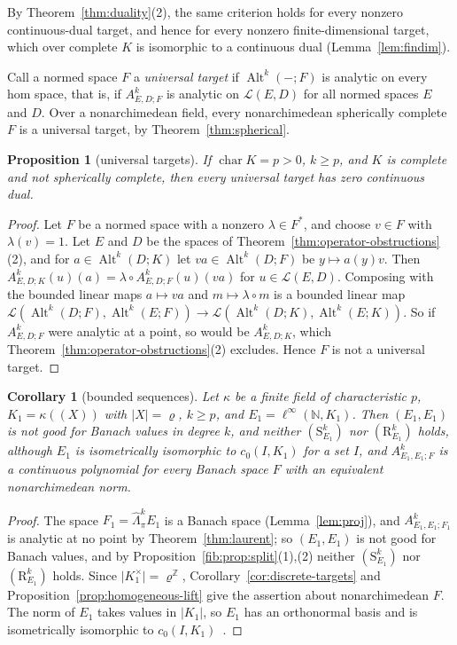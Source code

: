 \documentclass[11pt]{amsart}
\newtheorem{proposition}[theorem]{Proposition}
\newtheorem{corollary}[theorem]{Corollary}
\theoremstyle{definition}
\theoremstyle{remark}
\numberwithin{equation}{section}
\newcommand{\N}{\mathbb N}
\newcommand{\Z}{\mathbb Z}
\newcommand{\cL}{\mathcal L}
\newcommand{\Alt}{\operatorname{Alt}}
\newcommand{\linf}{\ell^\infty}
\newcommand{\abs}[1]{\lvert #1\rvert}
\theoremstyle{plain}
\theoremstyle{definition}
\theoremstyle{plain}
\begin{document}
By Theorem~\ref{thm:duality}(2), the same criterion holds for every nonzero continuous-dual target, and hence for every
nonzero finite-dimensional target, which over complete $K$ is isomorphic to a continuous dual (Lemma~\ref{lem:findim}).

Call a normed space $F$ a \emph{universal target} if $\Alt^k(-;F)$ is analytic on every hom space, that is, if
$A^k_{E,D;F}$ is analytic on $\cL(E,D)$ for all normed spaces $E$ and $D$. Over a nonarchimedean field, every
nonarchimedean spherically complete $F$ is a universal target, by Theorem~\ref{thm:spherical}.

\begin{proposition}[universal targets]\label{prop:universal-zero-dual}
If $\operatorname{char}K=p>0$, $k\ge p$, and $K$ is complete and not spherically complete, then every universal target
has zero continuous dual.
\end{proposition}

\begin{proof}
Let $F$ be a normed space with a nonzero $\lambda\in F^*$, and choose $v\in F$ with $\lambda(v)=1$. Let $E$ and $D$ be the
spaces of Theorem~\ref{thm:operator-obstructions}(2), and for $a\in\Alt^k(D;K)$ let $va\in\Alt^k(D;F)$ be $y\mapsto a(y)v$.
Then $A^k_{E,D;K}(u)(a)=\lambda\circ A^k_{E,D;F}(u)(va)$ for $u\in\cL(E,D)$. Composing with the bounded linear maps
$a\mapsto va$ and $m\mapsto\lambda\circ m$ is a bounded linear map
$\cL(\Alt^k(D;F),\Alt^k(E;F))\to\cL(\Alt^k(D;K),\Alt^k(E;K))$. So if $A^k_{E,D;F}$ were analytic at a point, so would be
$A^k_{E,D;K}$, which Theorem~\ref{thm:operator-obstructions}(2) excludes. Hence $F$ is not a universal target.
\end{proof}

\begin{corollary}[bounded sequences]\label{obs:cor:linf}
Let $\kappa$ be a finite field of characteristic $p$, $K_1=\kappa((X))$ with $\abs X=\varrho$, $k\ge p$, and
$E_1=\linf(\N,K_1)$. Then $(E_1,E_1)$ is not good for Banach values in degree $k$, and neither $(\mathrm S^k_{E_1})$ nor
$(\mathrm R^k_{E_1})$ holds, although $E_1$ is isometrically isomorphic to $c_0(I,K_1)$ for a set $I$, and
$A^k_{E_1,E_1;F}$ is a continuous polynomial for every Banach space $F$ with an equivalent nonarchimedean norm.
\end{corollary}

\begin{proof}
The space $F_1=\widehat\Lambda^k_\pi E_1$ is a Banach space (Lemma~\ref{lem:proj}), and $A^k_{E_1,E_1;F_1}$ is analytic
at no point by Theorem~\ref{thm:laurent}; so $(E_1,E_1)$ is not good for Banach values, and by
Proposition~\ref{fib:prop:split}(1),(2) neither $(\mathrm S^k_{E_1})$ nor $(\mathrm R^k_{E_1})$ holds. Since
$\abs{K_1^\times}=\varrho^\Z$, Corollary~\ref{cor:discrete-targets} and Proposition~\ref{prop:homogeneous-lift} give the
assertion about nonarchimedean $F$. The norm of $E_1$ takes values in $\abs{K_1}$, so $E_1$ has an orthonormal basis and
is isometrically isomorphic to $c_0(I,K_1)$~\cite[\S1, Prop.~1]{Se}.
\end{proof}
\end{document}
